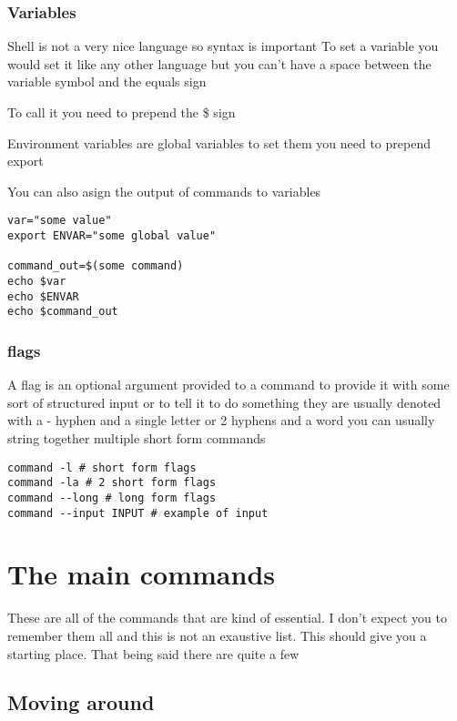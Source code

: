 \documentclass[a4paper]{article}
\begin{document}
\subsubsection*{Variables}
\label{sec:orgdb870cc}
\begin{notes}
	Shell is not a very nice language so syntax is important
	To set a variable you would set it like any other language but you can't have a
	space between the variable symbol and the equals sign

	To call it you need to prepend the \$ sign

	Environment variables are global variables to set them you need to prepend export

	You can also asign the output of commands to variables
\end{notes}
\begin{verbatim}
var="some value"
export ENVAR="some global value"

command_out=$(some command)
echo $var
echo $ENVAR
echo $command_out
\end{verbatim}
\subsubsection*{flags}
\label{sec:orge36456b}
\begin{notes}
	A flag is an optional argument provided to a command to provide it with some
	sort of structured input or to tell it to do something they are usually denoted
	with a - hyphen and a single letter or 2 hyphens and a word you can usually
	string together multiple short form commands
\end{notes}

\begin{verbatim}
command -l # short form flags
command -la # 2 short form flags
command --long # long form flags
command --input INPUT # example of input
\end{verbatim}

\section*{The main commands}
\label{sec:orgeb1bf18}
\begin{notes}
	These are all of the commands that are kind of essential. I don't expect you to
	remember them all and this is not an exaustive list. This should give you a
	starting place. That being said there are quite a few
\end{notes}
\subsection*{Moving around}
\label{sec:org08c2231}
\end{document}
